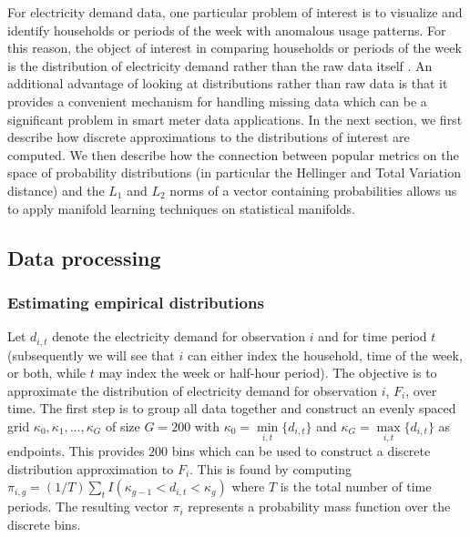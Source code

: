 \documentclass[11pt,a4paper,]{article}
\begin{document}
For electricity demand data, one particular problem of interest is to visualize and identify households or periods of the week with anomalous usage patterns. For this reason, the object of interest in comparing households or periods of the week is the distribution of electricity demand rather than the raw data itself \autocite{Hyndman2018-nq}. An additional advantage of looking at distributions rather than raw data is that it provides a convenient mechanism for handling missing data which can be a significant problem in smart meter data applications. In the next section, we first describe how discrete approximations to the distributions of interest are computed. We then describe how the connection between popular metrics on the space of probability distributions (in particular the Hellinger and Total Variation distance) and the \(L_1\) and \(L_2\) norms of a vector containing probabilities allows us to apply manifold learning techniques on statistical manifolds.

\hypertarget{dataprocessing}{%
\subsection{Data processing}\label{dataprocessing}}

\hypertarget{estimating-empirical-distributions}{%
\subsubsection*{Estimating empirical distributions}\label{estimating-empirical-distributions}}

Let \(d_{i,t}\) denote the electricity demand for observation \(i\) and for time period \(t\) (subsequently we will see that \(i\) can either index the household, time of the week, or both, while \(t\) may index the week or half-hour period). The objective is to approximate the distribution of electricity demand for observation \(i\), \(F_i\), over time. The first step is to group all data together and construct an evenly spaced grid \(\kappa_0,\kappa_1,\dots,\kappa_G\) of size \(G=200\) with \(\kappa_0=\underset{i,t}{\min} \{d_{i,t}\}\) and \(\kappa_G=\underset{i,t}{\max} \{d_{i,t}\}\) as endpoints. This provides \(200\) bins which can be used to construct a discrete distribution approximation to \(F_i\). This is found by computing \(\pi_{i,g}=(1/T)\sum_t I(\kappa_{g-1}<d_{i,t}<\kappa_g)\) where \(T\) is the total number of time periods. The resulting vector \(\pi_i\) represents a probability mass function over the discrete bins.
\end{document}
